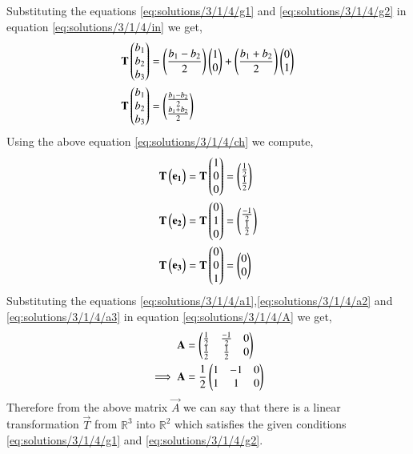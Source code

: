 Substituting the equations \eqref{eq:solutions/3/1/4/g1} and \eqref{eq:solutions/3/1/4/g2} in equation \eqref{eq:solutions/3/1/4/in} we get,
\begin{align}
        \mathbf{T}\begin{pmatrix}b_1\\b_2\\b_3\end{pmatrix}&=\left(\frac{b_1-b_2}{2}\right)\begin{pmatrix}1\\0\end{pmatrix}+\left(\frac{b_1+b_2}{2}\right)\begin{pmatrix}0\\1\end{pmatrix}\\
        \mathbf{T}\begin{pmatrix}b_1\\b_2\\b_3\end{pmatrix}&=\begin{pmatrix}\frac{b_1-b_2}{2}\\\frac{b_1+b_2}{2}\end{pmatrix}\label{eq:solutions/3/1/4/ch}
\end{align}
Using the above equation \eqref{eq:solutions/3/1/4/ch} we compute,
\begin{align}
    \mathbf{T}\begin{pmatrix}\mathbf{e_1}\end{pmatrix}=\mathbf{T}\begin{pmatrix}1\\0\\0\end{pmatrix}&=\begin{pmatrix}\frac{1}{2}\\\frac{1}{2}\end{pmatrix}\label{eq:solutions/3/1/4/a1}\\
    \mathbf{T}\begin{pmatrix}\mathbf{e_2}\end{pmatrix}=\mathbf{T}\begin{pmatrix}0\\1\\0\end{pmatrix}&=\begin{pmatrix}\frac{-1}{2}\\\frac{1}{2}\end{pmatrix}\label{eq:solutions/3/1/4/a2}\\
    \mathbf{T}\begin{pmatrix}\mathbf{e_3}\end{pmatrix}=\mathbf{T}\begin{pmatrix}0\\0\\1\end{pmatrix}&=\begin{pmatrix}0\\0\end{pmatrix}\label{eq:solutions/3/1/4/a3}
\end{align}
Substituting the equations \eqref{eq:solutions/3/1/4/a1},\eqref{eq:solutions/3/1/4/a2} and \eqref{eq:solutions/3/1/4/a3} in equation \eqref{eq:solutions/3/1/4/A} we get,
\begin{align}
    \mathbf{A}&=\begin{pmatrix}\frac{1}{2} & \frac{-1}{2} & 0\\\frac{1}{2} & \frac{1}{2} & 0\end{pmatrix}\\
   \implies \mathbf{A}&=\frac{1}{2}\begin{pmatrix}1 & -1 & 0\\1 & 1 & 0\end{pmatrix}
\end{align}
Therefore from the above matrix $\vec{A}$ we can say that there is a linear transformation $\vec{T}$ from $\mathbb{R}^3$ into $\mathbb{R}^2$ which satisfies the given conditions \eqref{eq:solutions/3/1/4/g1} and \eqref{eq:solutions/3/1/4/g2}.

